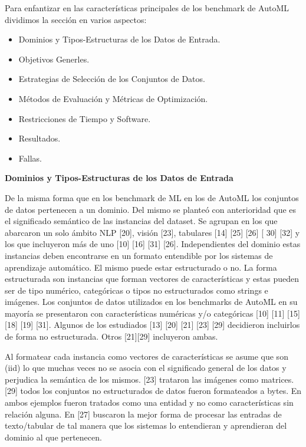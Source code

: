 Para enfantizar en las características principales de los benchmark de AutoML dividimos la sección en varios aspectos:

\begin{itemize}
    \item Dominios y Tipos-Estructuras de los Datos de Entrada.
    \item Objetivos Generles.
    \item Estrategias de Selección de los Conjuntos de Datos.
    \item Métodos de Evaluación y Métricas de Optimización. 
    \item Restricciones de Tiempo y  Software.
    \item Resultados.
    \item Fallas. 
    \end{itemize} 

\begin{flushleft} 
    {\large { \textbf{Dominios y Tipos-Estructuras de los Datos de Entrada}}}\label{subsection:dom_AutoML}
\end{flushleft}

De la misma forma que en los benchmark de ML en los de AutoML los conjuntos de datos pertenecen a un dominio. Del mismo se planteó con anterioridad que es el significado 
semántico de las instancias del dataset. Se agrupan en los que abarcaron un solo ámbito NLP [20], visión [23], tabulares [14] [25] [26] [ 30] [32] y los que 
incluyeron más de uno [10] [16] [31] [26]. Independientes del dominio estas instancias deben encontrarse en un formato entendible por los sistemas de aprendizaje 
automático. El mismo puede estar estructurado o no. La forma estructurada son instancias que forman vectores de características y estas pueden ser de tipo numérico, 
categóricas o tipos no estructurados como strings e imágenes. Los conjuntos de datos utilizados en los benchmarks de AutoML en su mayoría se presentaron con 
características numéricas y/o categóricas [10] [11] [15] [18] [19] [31]. Algunos de los estudiados [13] [20] [21] [23] [29] decidieron incluirlos de forma no estructurada. 
Otros [21][29] incluyeron ambas.

Al formatear cada instancia como vectores de características se asume que son (iid) lo que muchas veces no se asocia con el significado general de los datos y perjudica 
la semántica de los mismos.  [23] trataron las imágenes como matrices. [29] todos los conjuntos no estructurados de datos fueron formateados a bytes. En ambos 
ejemplos fueron tratados como una entidad y no como características sin relación alguna. En [27] buscaron la mejor forma de procesar las entradas de texto/tabular de 
tal manera que los sistemas lo entendieran y aprendieran del dominio al que pertenecen.

